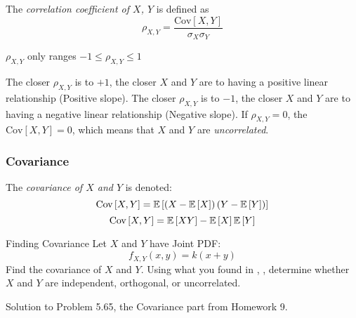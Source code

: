			\begin{definition} \label{def:Correlation Coefficient}
				The \emph{correlation coefficient of $X$, $Y$} is defined as
				\begin{equation} \label{eq:Correlation Coefficient}
					\rho_{X,Y} = \frac{\text{Cov} \left[ X,Y \right]}{\sigma_{X} \sigma_{Y}}
				\end{equation}
				\begin{remark}
					$\rho_{X,Y}$ only ranges $-1 \leq \rho_{X,Y} \leq 1$
				\end{remark}
				\begin{remark}
					The closer $\rho_{X,Y}$ is to $+1$, the closer $X$ and $Y$ are to having a positive linear relationship (Positive slope). \newline
					The closer $\rho_{X,Y}$ is to $-1$, the closer $X$ and $Y$ are to having a negative linear relationship (Negative slope). \newline
					If $\rho_{X,Y} = 0$, the $\text{Cov}\left[ X,Y \right] = 0$, which means that $X$ and $Y$ are \emph{uncorrelated}.
				\end{remark}
			\end{definition}

		\subsubsection{Covariance} \label{subsubsec:Covariance}
			\begin{definition}[Covariance] \label{def:Covariance}
				The \emph{covariance of $X$ and $Y$} is denoted:
				\begin{equation} \label{eq:Covariance-Form 1}
					\text{Cov} \left[ X,Y \right] = \operatorname{\operatorname{\mathbb{E}}} \left[ \left( X - \operatorname{\operatorname{\mathbb{E}}} \left[ X \right] \right) \left( Y - \operatorname{\operatorname{\mathbb{E}}} \left[ Y \right] \right)\right]
				\end{equation}
				\begin{equation} \label{eq:Covariance-Form 2}
					\text{Cov} \left[ X,Y \right] = \operatorname{\operatorname{\mathbb{E}}} \left[ XY \right] - \operatorname{\operatorname{\mathbb{E}}} \left[ X \right] \operatorname{\operatorname{\mathbb{E}}} \left[ Y \right]
				\end{equation}
			\end{definition}
			\begin{example}[Problem 5.65]{Finding Covariance}
                          Let $X$ and $Y$ have Joint PDF:
                          \begin{equation*}
                            f_{X,Y} \left( x,y \right) = k \left( x+y \right)
                          \end{equation*}
                          Find the covariance of $X$ and $Y$.
                          Using what you found in , , determine whether $X$ and $Y$ are independent, orthogonal, or uncorrelated.

                          \tcblower
				Solution to Problem 5.65, the Covariance part from Homework 9.
			\end{example}

